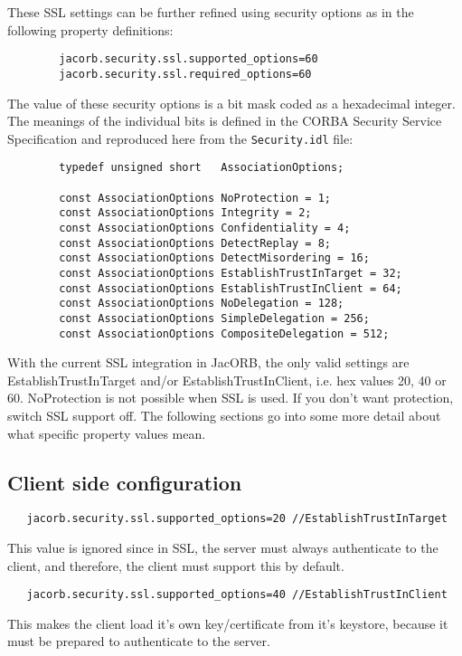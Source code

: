 \documentclass[12pt]{scrbook}
\begin{document}
These SSL settings can be further refined using security options as in
the following property definitions:

\begin{verbatim}
        jacorb.security.ssl.supported_options=60
        jacorb.security.ssl.required_options=60
\end{verbatim}

The  value  of  these security  options  is  a  bit  mask coded  as  a
hexadecimal integer. The meanings of the individual bits is defined in
the CORBA Security Service  Specification and reproduced here from the
{\tt Security.idl} file:

\begin{verbatim}
        typedef unsigned short   AssociationOptions;

        const AssociationOptions NoProtection = 1;
        const AssociationOptions Integrity = 2; 
        const AssociationOptions Confidentiality = 4; 
        const AssociationOptions DetectReplay = 8; 
        const AssociationOptions DetectMisordering = 16;
        const AssociationOptions EstablishTrustInTarget = 32; 
        const AssociationOptions EstablishTrustInClient = 64;
        const AssociationOptions NoDelegation = 128;
        const AssociationOptions SimpleDelegation = 256; 
        const AssociationOptions CompositeDelegation = 512;
\end{verbatim}

With the current SSL integration in JacORB, the only valid settings
are EstablishTrustInTarget and/or EstablishTrustInClient, i.e.  hex
values 20, 40 or 60. NoProtection is not possible when SSL is used. If
you don't want protection, switch SSL support off. The following
sections go into some more detail about what specific property values
mean. 

\subsection{Client side configuration}

\begin{verbatim}
   jacorb.security.ssl.supported_options=20 //EstablishTrustInTarget
\end{verbatim}
This value is ignored since in SSL, the server must always
authenticate to the client, and therefore, the client must support
this by default.

\begin{verbatim}
   jacorb.security.ssl.supported_options=40 //EstablishTrustInClient
\end{verbatim}
This makes the client load it's own key/certificate from it's
keystore, because it must be prepared to authenticate to the server.
\end{document}
